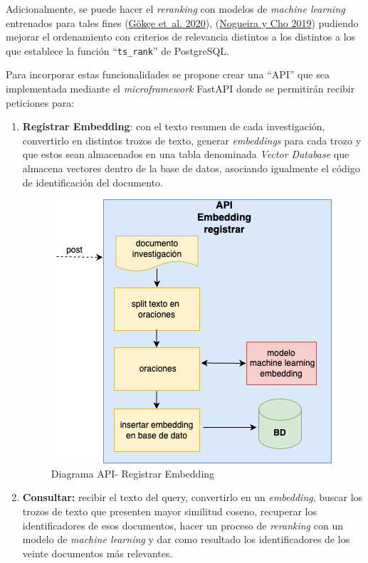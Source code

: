 \documentclass[
  12pt,
  openany]{book}
\begin{document}
Adicionalmente, se puede hacer el \emph{reranking} con modelos de \emph{machine learning} entrenados para tales fines (\protect\hyperlink{ref-guxf6kuxe7e2020}{Gökçe et~al. 2020}), (\protect\hyperlink{ref-nogueira2019}{Nogueira y Cho 2019}) pudiendo mejorar el ordenamiento con criterios de relevancia distintos a los distintos a los que establece la función ``\texttt{ts\_rank}'' de PostgreSQL.

Para incorporar estas funcionalidades se propone crear una ``API'' que sea implementada mediante el \emph{microframework} FastAPI donde se permitirán recibir peticiones para:

\begin{enumerate}
\def\labelenumi{\arabic{enumi}.}
\item
  \textbf{Registrar Embedding}: con el texto resumen de cada investigación, convertirlo en distintos trozos de texto, generar \emph{embeddings} para cada trozo y que estos sean almacenados en una tabla denominada \emph{Vector Database} que almacena vectores dentro de la base de datos, asociando igualmente el código de identificación del documento.

  \begin{figure}

  {\centering \includegraphics[width=0.45\linewidth]{images/05-desarrollo/5_ciclo/diagramapiregistrar1} 

  }

  \caption{Diagrama API- Registrar Embedding}\label{fig:semanticoregistrar}
  \end{figure}
\item
  \textbf{Consultar:} recibir el texto del query, convertirlo en un \emph{embedding}, buscar los trozos de texto que presenten mayor similitud coseno, recuperar los identificadores de esos documentos, hacer un proceso de \emph{reranking} con un modelo de \emph{machine learning} y dar como resultado los identificadores de los veinte documentos más relevantes.


\end{enumerate}
\end{document}
